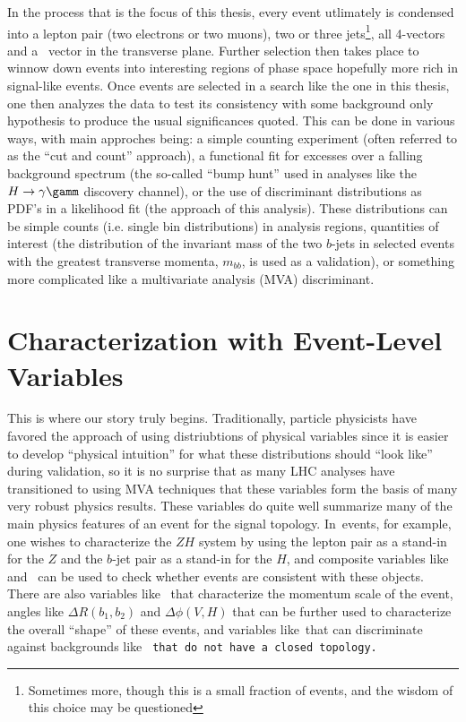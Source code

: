 In the process that is the focus of this thesis, every event utlimately is condensed into a lepton pair (two electrons or two muons), two or three jets\footnote{Sometimes more, though this is a small fraction of events, and the wisdom of this choice may be questioned}, all 4-vectors and a \met\, vector in the transverse plane.  Further selection then takes place to winnow down events into interesting regions of phase space hopefully more rich in signal-like events.  Once events are selected in a search like the one in this thesis, one then analyzes the data to test its consistency with some background only hypothesis to produce the usual significances quoted.  This can be done in various ways, with main approches being: a simple counting experiment (often referred to as the ``cut and count'' approach), a functional fit for excesses over a falling background spectrum (the so-called ``bump hunt'' used in analyses like the $H\to\gamma\gamm$ discovery channel), or the use of discriminant distributions as PDF's in a likelihood fit (the approach of this analysis).  These distributions can be simple counts (i.e. single bin distributions) in analysis regions, quantities of interest (the distribution of the invariant mass of the two $b$-jets in selected events with the greatest transverse momenta, $m_{bb}$, is used as a validation), or something more complicated like a multivariate analysis (MVA) discriminant.

\section{Characterization with Event-Level Variables}
This is where our story truly begins.  Traditionally, particle physicists have favored the approach of using distriubtions of physical variables since it is easier to develop ``physical intuition'' for what these distributions should ``look like'' during validation, so it is no surprise that as many LHC analyses have transitioned to using MVA techniques that these variables form the basis of many very robust physics results.  These variables do quite well summarize many of the main physics features of an event for the signal topology.  In \ZH\,events, for example, one wishes to characterize the $ZH$ system by using the lepton pair as a stand-in for the $Z$ and the $b$-jet pair as a stand-in for the $H$, and composite variables like \mbb\,and \mll\, can be used to check whether events are consistent with these objects.  There are also variables like \ptv\, that characterize the momentum scale of the event, angles like $\Delta R\left(b_1,b_2\right)$ and $\Delta\phi\left(V,H\right)$ that can be further used to characterize the overall ``shape'' of these events, and variables like \met\,that can discriminate against backgrounds like \tt\,that do not have a closed topology.


